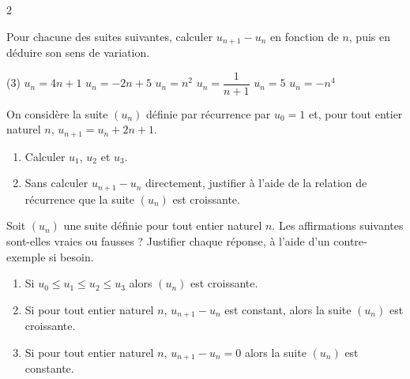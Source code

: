 \documentclass[10pt,a4paper]{article}
\begin{document}
\begin{multicols}{2}

\begin{exo}[][]
Pour chacune des suites suivantes, calculer \(u_{n+1}-u_n\) en fonction de \(n\), puis en déduire son sens de variation.

\begin{tasks}(3)
    \task \(u_n = 4n+1\)
    \task \(u_n = -2n+5\)
    \task \(u_n = n^2\)
    \task \(u_n = \dfrac{1}{n+1}\)
    \task \(u_n = 5\)
    \task \(u_n = -n^4\)
\end{tasks}
\end{exo}

\begin{exo}[][appro]
On considère la suite \((u_n)\) définie par récurrence par \(u_0=1\) et, pour tout entier naturel \(n\), \(u_{n+1}=u_n+2n+1\).

\begin{enumerate}[leftmargin=*]
    \item Calculer \(u_1\), \(u_2\) et \(u_3\).
    \item Sans calculer \(u_{n+1}-u_n\) directement, justifier à l'aide de la relation de récurrence que la suite \((u_n)\) est croissante.
\end{enumerate}
\end{exo}


\begin{exo}
Soit \((u_n)\) une suite définie pour tout entier naturel \(n\). Les affirmations suivantes sont-elles vraies ou fausses ? Justifier chaque réponse, à l'aide d'un contre-exemple si besoin.

\begin{enumerate}[leftmargin=*]
    \item Si \(u_0\leq u_1 \leq u_2 \leq u_3\) alors \((u_n)\) est croissante.
    \item Si pour tout entier naturel \(n\), \(u_{n+1}-u_n\) est constant, alors la suite \((u_n)\) est croissante.
    \item Si pour tout entier naturel \(n\), \(u_{n+1}-u_n = 0\) alors la suite \((u_n)\) est constante.
\end{enumerate}
\end{exo}


\end{multicols}
\end{document}
